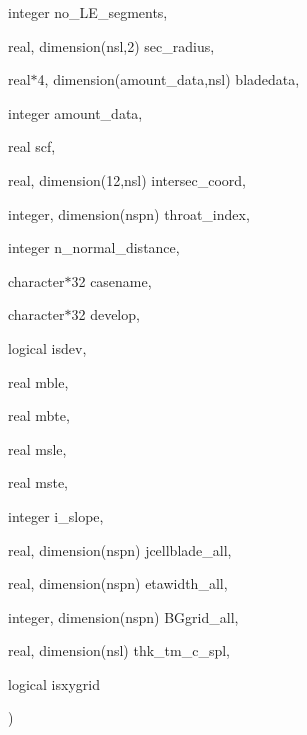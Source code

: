 {\begin{DoxyParamCaption}
\item[{integer}]{no\+\_\+\+L\+E\+\_\+segments, }
\item[{real, dimension(nsl,2)}]{sec\+\_\+radius, }
\item[{real$\ast$4, dimension(amount\+\_\+data,nsl)}]{bladedata, }
\item[{integer}]{amount\+\_\+data, }
\item[{real}]{scf, }
\item[{real, dimension(12,nsl)}]{intersec\+\_\+coord, }
\item[{integer, dimension(nspn)}]{throat\+\_\+index, }
\item[{integer}]{n\+\_\+normal\+\_\+distance, }
\item[{character$\ast$32}]{casename, }
\item[{character$\ast$32}]{develop, }
\item[{logical}]{isdev, }
\item[{real}]{mble, }
\item[{real}]{mbte, }
\item[{real}]{msle, }
\item[{real}]{mste, }
\item[{integer}]{i\+\_\+slope, }
\item[{real, dimension(nspn)}]{jcellblade\+\_\+all, }
\item[{real, dimension(nspn)}]{etawidth\+\_\+all, }
\item[{integer, dimension(nspn)}]{B\+Ggrid\+\_\+all, }
\item[{real, dimension(nsl)}]{thk\+\_\+tm\+\_\+c\+\_\+spl, }
\item[{logical}]{isxygrid}
\end{DoxyParamCaption}
)}\label{bladegen_8f90_abe1d53034e73a0fd4caf61124de7e6eb}


